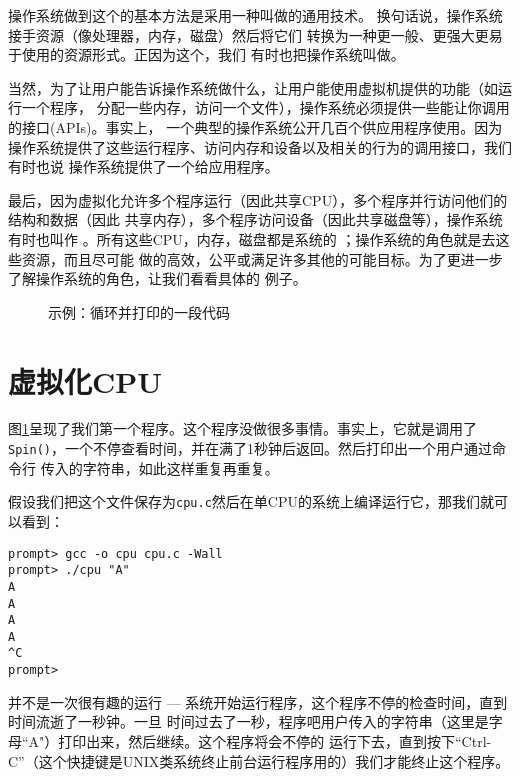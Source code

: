 操作系统做到这个的基本方法是采用一种叫做的通用技术。
换句话说，操作系统接手资源（像处理器，内存，磁盘）然后将它们
转换为一种更一般、更强大更易于使用的资源形式。正因为这个，我们
有时也把操作系统叫做。

当然，为了让用户能告诉操作系统做什么，让用户能使用虚拟机提供的功能（如运行一个程序，
分配一些内存，访问一个文件），操作系统必须提供一些能让你调用的接口(APIs)。事实上，
一个典型的操作系统公开几百个供应用程序使用。因为
操作系统提供了这些运行程序、访问内存和设备以及相关的行为的调用接口，我们有时也说
操作系统提供了一个给应用程序。

最后，因为虚拟化允许多个程序运行（因此共享CPU），多个程序并行访问他们的结构和数据（因此
共享内存），多个程序访问设备（因此共享磁盘等），操作系统有时也叫作
。所有这些CPU，内存，磁盘都是系统的
；操作系统的角色就是去这些资源，而且尽可能
做的高效，公平或满足许多其他的可能目标。为了更进一步了解操作系统的角色，让我们看看具体的
例子。

\begin{figure}[tbh]
	\linespread{1}
	\lstset{style=customc}
	
	\caption{示例：循环并打印的一段代码}
	\label{simplecode}
\end{figure}

\section{虚拟化CPU}
图\ref{simplecode}呈现了我们第一个程序。这个程序没做很多事情。事实上，它就是调用了
\lstinline!Spin()!，一个不停查看时间，并在满了1秒钟后返回。然后打印出一个用户通过命令行
传入的字符串，如此这样重复再重复。

假设我们把这个文件保存为\texttt{cpu.c}然后在单CPU的系统上编译运行它，那我们就可以看到：

\begin{lstlisting}[basicstyle=\ttfamily]
prompt> gcc -o cpu cpu.c -Wall
prompt> ./cpu "A"
A
A
A
A
^C
prompt>
\end{lstlisting}

并不是一次很有趣的运行 --- 系统开始运行程序，这个程序不停的检查时间，直到时间流逝了一秒钟。一旦
时间过去了一秒，程序吧用户传入的字符串（这里是字母“A"）打印出来，然后继续。这个程序将会不停的
运行下去，直到按下“Ctrl-C”（这个快捷键是UNIX类系统终止前台运行程序用的）我们才能终止这个程序。
\cite{RichardP.Feynman2011}









\printbibliography[heading=subbibintoc,title={引用文献}]












